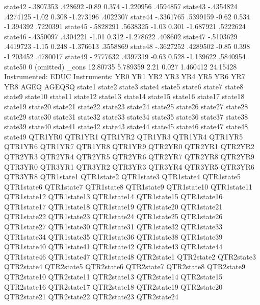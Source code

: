      state42 {\VBAR}  -.3807353    .428692    -0.89   0.374    -1.220956    .4594857
     state43 {\VBAR}  -.4354824   .4274125    -1.02   0.308    -1.273196    .4022307
     state44 {\VBAR}  -.3361765   .5399159    -0.62   0.534    -1.394392    .7220391
     state45 {\VBAR}  -.5828291   .5638325    -1.03   0.301    -1.687921    .5222624
     state46 {\VBAR}  -.4350097   .4304221    -1.01   0.312    -1.278622     .408602
     state47 {\VBAR}  -.5103629   .4419723    -1.15   0.248    -1.376613    .3558869
     state48 {\VBAR}  -.3627252   .4289502    -0.85   0.398    -1.203452    .4780017
     state49 {\VBAR}  -.2777632   .4397319    -0.63   0.528    -1.139622    .5840954
     state50 {\VBAR}          0  (omitted)
       _cons {\VBAR}   12.80735   5.789359     2.21   0.027     1.460412    24.15428
Instrumented:  EDUC
Instruments:   YR0 YR1 YR2 YR3 YR4 YR5 YR6 YR7 YR8 AGEQ AGEQSQ state1 state2
               state3 state4 state5 state6 state7 state8 state9 state10
               state11 state12 state13 state14 state15 state16 state17
               state18 state19 state20 state21 state22 state23 state24
               state25 state26 state27 state28 state29 state30 state31
               state32 state33 state34 state35 state36 state37 state38
               state39 state40 state41 state42 state43 state44 state45
               state46 state47 state48 state49 QTR1YR0 QTR1YR1 QTR1YR2
               QTR1YR3 QTR1YR4 QTR1YR5 QTR1YR6 QTR1YR7 QTR1YR8 QTR1YR9
               QTR2YR0 QTR2YR1 QTR2YR2 QTR2YR3 QTR2YR4 QTR2YR5 QTR2YR6
               QTR2YR7 QTR2YR8 QTR2YR9 QTR3YR0 QTR3YR1 QTR3YR2 QTR3YR3
               QTR3YR4 QTR3YR5 QTR3YR6 QTR3YR8 QTR1state1 QTR1state2
               QTR1state3 QTR1state4 QTR1state5 QTR1state6 QTR1state7
               QTR1state8 QTR1state9 QTR1state10 QTR1state11 QTR1state12
               QTR1state13 QTR1state14 QTR1state15 QTR1state16 QTR1state17
               QTR1state18 QTR1state19 QTR1state20 QTR1state21 QTR1state22
               QTR1state23 QTR1state24 QTR1state25 QTR1state26 QTR1state27
               QTR1state30 QTR1state31 QTR1state32 QTR1state33 QTR1state34
               QTR1state35 QTR1state36 QTR1state38 QTR1state39 QTR1state40
               QTR1state41 QTR1state42 QTR1state43 QTR1state44 QTR1state46
               QTR1state47 QTR1state48 QTR2state1 QTR2state2 QTR2state3
               QTR2state4 QTR2state5 QTR2state6 QTR2state7 QTR2state8
               QTR2state9 QTR2state10 QTR2state11 QTR2state13 QTR2state14
               QTR2state15 QTR2state16 QTR2state17 QTR2state18 QTR2state19
               QTR2state20 QTR2state21 QTR2state22 QTR2state23 QTR2state24
